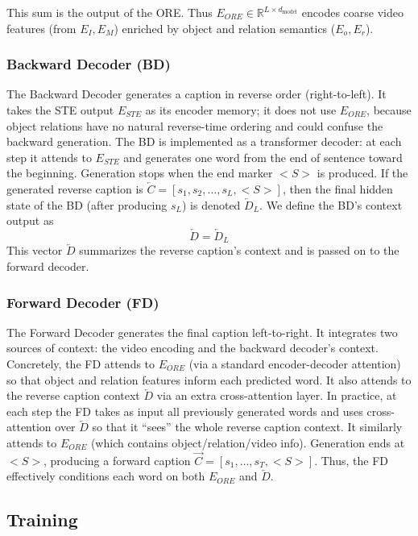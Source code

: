 This sum is the output of the ORE. Thus $E_{ORE}\in\mathbb{R}^{L\times d_{\text{model}}}$ encodes coarse video features (from $E_I,E_M$) enriched by object and relation semantics ($E_o,E_r$).

\subsubsection{Backward Decoder (BD)}

The Backward Decoder generates a caption in reverse order (right-to-left). It takes the STE output $E_{STE}$ as its encoder memory; it does not use $E_{ORE}$, because object relations have no natural reverse-time ordering and could confuse the backward generation. The BD is implemented as a transformer decoder: at each step it attends to $E_{STE}$ and generates one word from the end of sentence toward the beginning. Generation stops when the end marker $<S>$ is produced. If the generated reverse caption is $\overleftarrow{C} = [s_1, s_2, \dots, s_L, <S>]$, then the final hidden state of the BD (after producing $s_L$) is denoted $\overleftarrow{D}_L$. We define the BD's context output as
$$
\overleftarrow{D} = \overleftarrow{D}_L
$$
This vector $\overleftarrow{D}$ summarizes the reverse caption's context and is passed on to the forward decoder.

\subsubsection{Forward Decoder (FD)}

The Forward Decoder generates the final caption left-to-right. It integrates two sources of context: the video encoding and the backward decoder's context. Concretely, the FD attends to $E_{ORE}$ (via a standard encoder-decoder attention) so that object and relation features inform each predicted word. It also attends to the reverse caption context $\overleftarrow{D}$ via an extra cross-attention layer. In practice, at each step the FD takes as input all previously generated words and uses cross-attention over $\overleftarrow{D}$ so that it ``sees'' the whole reverse caption context. It similarly attends to $E_{ORE}$ (which contains object/relation/video info). Generation ends at $<S>$, producing a forward caption $\overrightarrow{C}=[s_1,\dots,s_T,<S>]$. Thus, the FD effectively conditions each word on both $E_{ORE}$ and $\overleftarrow{D}$.

\subsection{Training}

